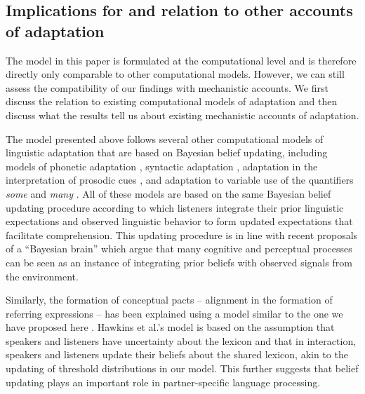 \subsection{Implications for and relation to other accounts of adaptation}

The model in this paper is formulated at the computational level \cite{Marr1982,Anderson1990} 
and is therefore directly only comparable to other computational models. However, we can still assess 
the compatibility of our findings with mechanistic accounts. We first discuss the relation to existing computational 
models of adaptation and then discuss what the results tell us about existing mechanistic accounts of
 adaptation.

The model presented above follows several other computational models of linguistic adaptation that are based 
on Bayesian belief updating, including models of phonetic adaptation \cite{Kleinschmidt2015}, syntactic 
adaptation \cite{Kleinschmidt2012}, adaptation in the interpretation of prosodic cues \cite{Roettger2019},
and adaptation to variable use of the quantifiers \textit{some} and \textit{many} \cite{Qing2014}. 
All of these models are based on the same Bayesian belief updating procedure according to which listeners integrate
their prior linguistic expectations and observed linguistic behavior to form updated expectations that facilitate comprehension.
This updating procedure is in line with recent proposals of a ``Bayesian brain'' \cite[e.g.,][]{Clark2013,Friston2010} which argue that
many cognitive and perceptual processes can be seen as an instance of integrating prior beliefs with observed signals from the environment.

Similarly, the formation of conceptual pacts \cite{Clark1986} --  alignment in the formation of referring expressions -- has been explained using a model  similar to the one we have proposed here \cite{Hawkins2017}. Hawkins et al.'s model is based on the assumption that speakers and listeners have uncertainty about the lexicon \cite[see also][]{Bergen2016} and that in interaction, speakers 
and listeners update their beliefs about the shared lexicon, akin to the updating of threshold distributions 
in our model. This further suggests that belief updating plays an important role in partner-specific language processing.

